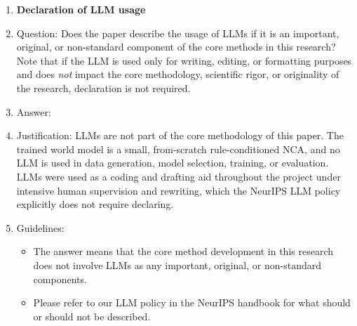 \begin{enumerate}
\item {\bf Declaration of LLM usage}
    \item[] Question: Does the paper describe the usage of LLMs if it is an important, original, or non-standard component of the core methods in this research? Note that if the LLM is used only for writing, editing, or formatting purposes and does \emph{not} impact the core methodology, scientific rigor, or originality of the research, declaration is not required.
    \item[] Answer: \answerNA{}
    \item[] Justification: LLMs are not part of the core methodology of this paper. The trained world model is a small, from-scratch rule-conditioned NCA, and no LLM is used in data generation, model selection, training, or evaluation. LLMs were used as a coding and drafting aid throughout the project under intensive human supervision and rewriting, which the NeurIPS LLM policy explicitly does not require declaring.
    \item[] Guidelines:
    \begin{itemize}
        \item The answer \answerNA{} means that the core method development in this research does not involve LLMs as any important, original, or non-standard components.
        \item Please refer to our LLM policy in the NeurIPS handbook for what should or should not be described.
    \end{itemize}

\end{enumerate}
